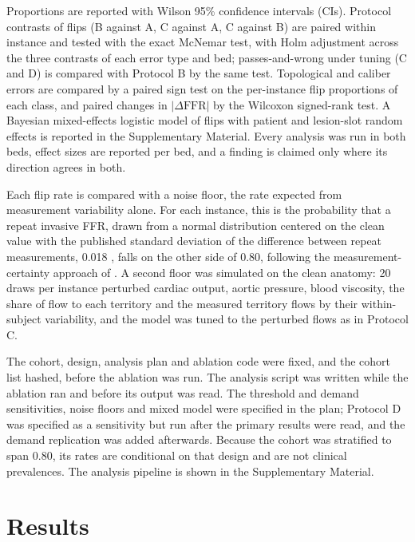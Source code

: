 \documentclass[journal,twoside,web]{ieeecolor}
\begin{document}
Proportions are reported with Wilson 95\% confidence intervals (CIs). Protocol contrasts of flips (B against A, C
against A, C against B) are paired within instance and tested with the exact McNemar test, with Holm adjustment
across the three contrasts of each error type and bed; passes-and-wrong under tuning (C and D) is compared with
Protocol B by the same test. Topological and caliber errors are compared by a paired sign test on
the per-instance flip proportions of each class, and paired changes in $|\Delta\mathrm{FFR}|$ by the Wilcoxon
signed-rank test. A Bayesian mixed-effects logistic model of flips with patient and lesion-slot random effects is reported in the
Supplementary Material. Every analysis was run in both beds, effect sizes are reported per bed, and a finding is
claimed only where its direction agrees in both.

Each flip rate is compared with a noise floor, the rate expected from measurement variability alone. For each instance, this is the probability that a repeat invasive FFR, drawn from a normal
distribution centered on the clean value with the published standard deviation of the difference between repeat measurements, 0.018 \cite{johnson2015}, falls on the other side of 0.80, following the measurement-certainty approach of \cite{petraco2013}. A second floor was simulated on the clean anatomy: 20 draws
per instance perturbed cardiac output, aortic pressure, blood viscosity, the share of flow to each territory and the
measured territory flows by their within-subject variability, and the model was tuned to the perturbed flows as in
Protocol C.

The cohort, design, analysis plan and ablation code were fixed, and the cohort list hashed, before the ablation was run. The analysis script was written while the ablation ran and before its output was read.
The threshold and demand sensitivities, noise floors and mixed model were specified in the plan; Protocol D was
specified as a sensitivity but run after the primary results were read, and the demand replication was added
afterwards. Because the cohort was stratified to span 0.80, its rates are conditional
on that design and are not clinical prevalences. The analysis pipeline is shown in the Supplementary Material.

\section{Results}
\end{document}
